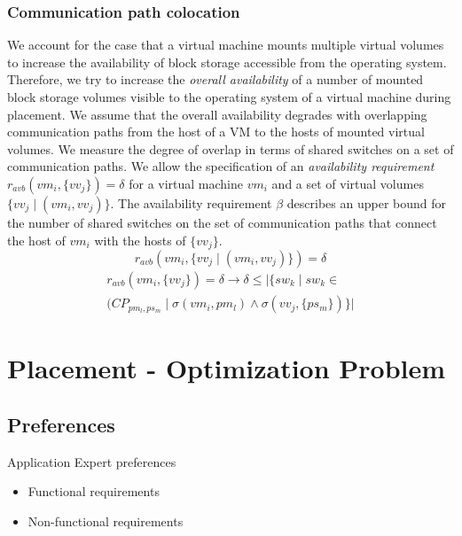 \documentclass[conference]{IEEEtran}
\begin{document}
\subsubsection{Communication path colocation}
We account for the case that a virtual machine mounts multiple virtual volumes to increase the availability of block storage accessible from the operating system. Therefore, we try to increase the \textit{overall availability} of a number of mounted block storage volumes visible to the operating system of a virtual machine during placement. We assume that the overall availability degrades with overlapping communication paths from the host of a VM to the hosts of mounted virtual volumes. We measure the degree of overlap in terms of shared switches on a set of communication paths.
We allow the specification of an \textit{availability requirement} $r_{avb}(vm_i, \{vv_j\}) = \delta$ for a virtual machine $vm_i$ and a set of virtual volumes $\{ vv_j \mid (vm_i, vv_j) \}$. The availability requirement $\beta$ describes an upper bound for the number of shared switches on the set of communication paths that connect the host of $vm_i$ with the hosts of $\{vv_j\}$.
\begin{equation}
r_{avb}(vm_i, \{vv_j \mid (vm_i, vv_j)\}) = \delta
\end{equation}
\begin{multline}
r_{avb}(vm_i, \{vv_j\}) = \delta \rightarrow \delta \leq | \{ sw_k \mid sw_k \in \\ (CP_{pm_l,ps_m} \mid \sigma(vm_i,pm_l) \wedge \sigma(vv_j, \{ ps_m \}) \} |
\end{multline}
\section{Placement - Optimization Problem}

\subsection{Preferences}
Application Expert preferences
\begin{itemize}
	\item Functional requirements
	\item Non-functional requirements
\end{itemize}
\end{document}
